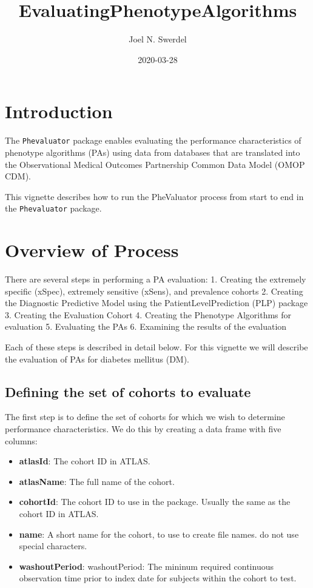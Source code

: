 \documentclass[
]{article}
\title{EvaluatingPhenotypeAlgorithms}
\author{Joel N. Swerdel}
\date{2020-03-28}
\providecommand{\tightlist}{%
  \setlength{\itemsep}{0pt}\setlength{\parskip}{0pt}}
\begin{document}
\maketitle

{
\setcounter{tocdepth}{3}
\tableofcontents
}
\newpage

\hypertarget{introduction}{%
\section{Introduction}\label{introduction}}

The \texttt{Phevaluator} package enables evaluating the performance
characteristics of phenotype algorithms (PAs) using data from databases
that are translated into the Observational Medical Outcomes Partnership
Common Data Model (OMOP CDM).

This vignette describes how to run the PheValuator process from start to
end in the \texttt{Phevaluator} package.

\hypertarget{overview-of-process}{%
\section{Overview of Process}\label{overview-of-process}}

There are several steps in performing a PA evaluation: 1. Creating the
extremely specific (xSpec), extremely sensitive (xSens), and prevalence
cohorts 2. Creating the Diagnostic Predictive Model using the
PatientLevelPrediction (PLP) package 3. Creating the Evaluation Cohort
4. Creating the Phenotype Algorithms for evaluation 5. Evaluating the
PAs 6. Examining the results of the evaluation

Each of these steps is described in detail below. For this vignette we
will describe the evaluation of PAs for diabetes mellitus (DM).

\hypertarget{defining-the-set-of-cohorts-to-evaluate}{%
\subsection{Defining the set of cohorts to
evaluate}\label{defining-the-set-of-cohorts-to-evaluate}}

The first step is to define the set of cohorts for which we wish to
determine performance characteristics. We do this by creating a data
frame with five columns:

\begin{itemize}
\tightlist
\item
  \textbf{atlasId}: The cohort ID in ATLAS.
\item
  \textbf{atlasName}: The full name of the cohort.
\item
  \textbf{cohortId}: The cohort ID to use in the package. Usually the
  same as the cohort ID in ATLAS.
\item
  \textbf{name}: A short name for the cohort, to use to create file
  names. do not use special characters.
\item
  \textbf{washoutPeriod}: washoutPeriod: The mininum required continuous
  observation time prior to index date for subjects within the cohort to
  test.
\end{itemize}
\end{document}
